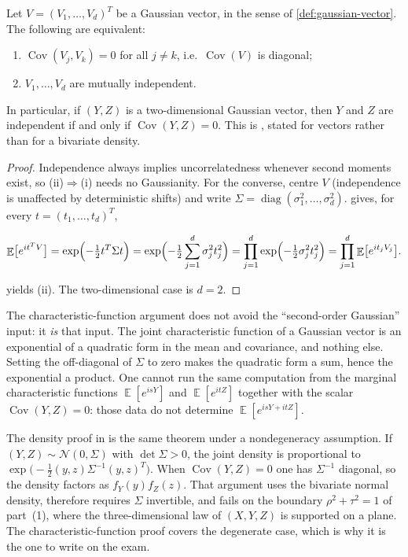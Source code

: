 \documentclass[11pt,a4paper]{article}
\DeclareMathOperator{\E}{\mathbb{E}}
\begin{document}
\begin{theorem}
\label{thm:gauss-uncorr-indep}
Let \( V=(V_{1},\dots,V_{d})^{T} \) be a Gaussian vector, in the sense of \cref{def:gaussian-vector}. The following are equivalent:
\begin{enumerate}[label=\textup{(\roman*)}]
    \item
    \( \operatorname{Cov}(V_{j},V_{k})=0 \) for all \( j\neq k \), i.e.\ \( \operatorname{Cov}(V) \) is diagonal;
    \item
    \( V_{1},\dots,V_{d} \) are mutually independent.
\end{enumerate}
In particular, if \( (Y,Z) \) is a two-dimensional Gaussian vector, then \( Y \) and \( Z \) are independent if and only if \( \operatorname{Cov}(Y,Z)=0 \). This is \citep[Theorem~6.2.1]{ren2024}, stated for vectors rather than for a bivariate density.
\end{theorem}

\begin{proof}
Independence always implies uncorrelatedness whenever second moments exist, so (ii)\(\Rightarrow\)(i) needs no Gaussianity. For the converse, centre \( V \) (independence is unaffected by deterministic shifts) and write \( \Sigma=\operatorname{diag}(\sigma_{1}^{2},\dots,\sigma_{d}^{2}) \).  gives, for every \( t=(t_{1},\dots,t_{d})^{T} \),

\[
\E\bigl[e^{it^{T}V}\bigr]
=
\exp\Bigl(-\tfrac12 t^{T}\Sigma t\Bigr)
=
\exp\Bigl(-\tfrac12\sum_{j=1}^{d}\sigma_{j}^{2}t_{j}^{2}\Bigr)
=
\prod_{j=1}^{d}\exp\Bigl(-\tfrac12\sigma_{j}^{2}t_{j}^{2}\Bigr)
=
\prod_{j=1}^{d}\E\bigl[e^{it_{j}V_{j}}\bigr].
\]

 yields (ii). The two-dimensional case is \( d=2 \).
\end{proof}

The characteristic-function argument does not avoid the ``second-order Gaussian'' input: it \emph{is} that input. The joint characteristic function of a Gaussian vector is an exponential of a quadratic form in the mean and covariance, and nothing else. Setting the off-diagonal of \( \Sigma \) to zero makes the quadratic form a sum, hence the exponential a product. One cannot run the same computation from the marginal characteristic functions \( \E[e^{isY}] \) and \( \E[e^{itZ}] \) together with the scalar \( \operatorname{Cov}(Y,Z)=0 \): those data do not determine \( \E[e^{isY+itZ}] \).

The density proof in \citep[Theorem~6.2.1]{ren2024} is the same theorem under a nondegeneracy assumption. If \( (Y,Z)\sim\mathcal{N}(0,\Sigma) \) with \( \det\Sigma>0 \), the joint density is proportional to \( \exp\bigl(-\tfrac12(y,z)\Sigma^{-1}(y,z)^{T}\bigr) \). When \( \operatorname{Cov}(Y,Z)=0 \) one has \( \Sigma^{-1} \) diagonal, so the density factors as \( f_{Y}(y)f_{Z}(z) \). That argument uses the bivariate normal density, therefore requires \( \Sigma \) invertible, and fails on the boundary \( \rho^{2}+\tau^{2}=1 \) of part~(1), where the three-dimensional law of \( (X,Y,Z) \) is supported on a plane. The characteristic-function proof covers the degenerate case, which is why it is the one to write on the exam.
\end{document}
